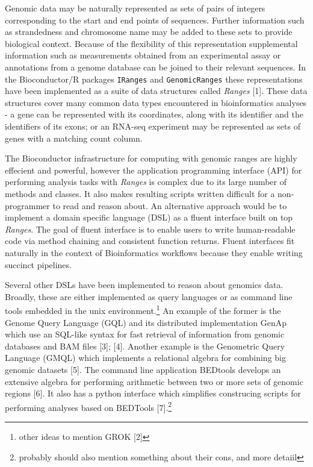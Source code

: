 \documentclass[10pt,letterpaper]{article}
\begin{document}
Genomic data may be naturally represented as sets of pairs of integers
corresponding to the start and end points of sequences. Further
information such as strandedness and chromosome name may be added to
these sets to provide biological context. Because of the flexibility of
this representation supplemental information such as measurements
obtained from an experimental assay or annotations from a genome
database can be joined to their relevant sequences. In the
Bioconductor/R packages \texttt{IRanges} and \texttt{GenomicRanges}
these representations have been implemented as a suite of data
structures called \emph{Ranges} {[}1{]}. These data structures cover
many common data types encountered in bioinformatics analyses - a gene
can be represented with its coordinates, along with its identifier and
the identifiers of its exons; or an RNA-seq experiment may be
represented as sets of genes with a matching count column.

The Bioconductor infrastructure for computing with genomic ranges are
highly effecient and powerful, however the application programming
interface (API) for performing analysis tasks with \emph{Ranges} is
complex due to its large number of methods and classes. It also makes
resulting scripts written difficult for a non-programmer to read and
reason about. An alternative approach would be to implement a domain
specific language (DSL) as a fluent interface built on top
\emph{Ranges}. The goal of fluent interface is to enable users to write
human-readable code via method chaining and consistent function returns.
Fluent interfaces fit naturally in the context of Bioinformatics
workflows because they enable writing succinct pipelines.

Several other DSLs have been implemented to reason about genomics data.
Broadly, these are either implemented as query languages or as command
line tools embedded in the unix environment.\footnote{other ideas to
  mention GROK {[}2{]}} An example of the former is the Genome Query
Language (GQL) and its distributed implementation GenAp which use an
SQL-like syntax for fast retrieval of information from genomic databases
and BAM files {[}3{]}; {[}4{]}. Another example is the Genometric Query
Language (GMQL) which implements a relational algebra for combining big
genomic datasets {[}5{]}. The command line application BEDtools develops
an extensive algebra for performing arithmetic between two or more sets
of genomic regions {[}6{]}. It also has a python interface which
simplifies construcing scripts for performing analyses based on BEDTools
{[}7{]}.\footnote{probably should also mention something about their
  cons, and more detaiil}
\end{document}
